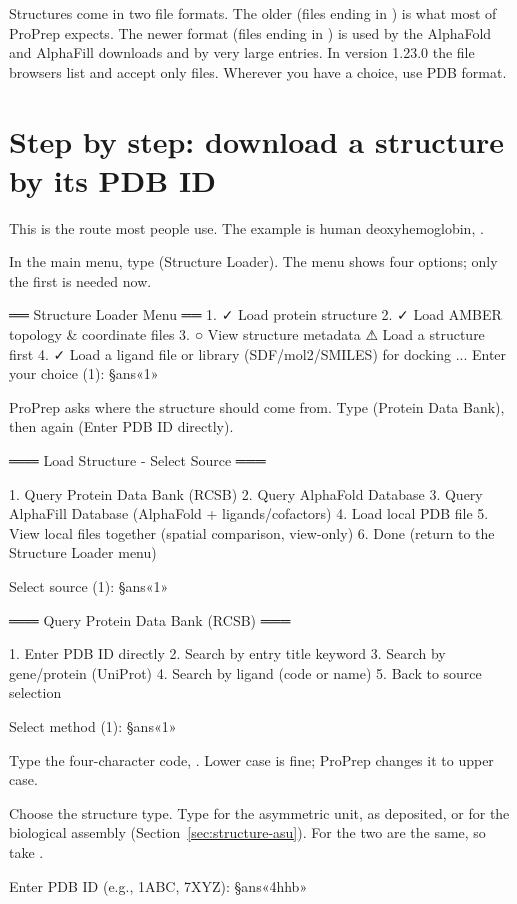 Structures come in two file formats. The older  (files ending
in ) is what most of ProPrep expects. The newer  format
(files ending in ) is used by the AlphaFold and AlphaFill downloads
and by very large entries. In version 1.23.0 the file browsers list and accept
only  files. Wherever you have a choice, use PDB format.

\section{Step by step: download a structure by its PDB ID}
\label{sec:structure-pdbid}

This is the route most people use. The example is human deoxyhemoglobin,
.

\begin{steps}
  \item In the main menu, type  (Structure Loader). The menu shows four
        options; only the first is needed now.
\begin{screen}
══ Structure Loader Menu ══
  1. ✓ Load protein structure
  2. ✓ Load AMBER topology & coordinate files
  3. ○ View structure metadata
       ⚠ Load a structure first
  4. ✓ Load a ligand file or library (SDF/mol2/SMILES) for docking
...
Enter your choice (1): §ans«1»
\end{screen}
  \item ProPrep asks where the structure should come from. Type 
        (Protein Data Bank), then  again (Enter PDB ID directly).
\begin{screen}
═══ Load Structure - Select Source ═══

1. Query Protein Data Bank (RCSB)
2. Query AlphaFold Database
3. Query AlphaFill Database (AlphaFold + ligands/cofactors)
4. Load local PDB file
5. View local files together (spatial comparison, view-only)
6. Done (return to the Structure Loader menu)

Select source (1): §ans«1»

═══ Query Protein Data Bank (RCSB) ═══

1. Enter PDB ID directly
2. Search by entry title keyword
3. Search by gene/protein (UniProt)
4. Search by ligand (code or name)
5. Back to source selection

Select method (1): §ans«1»
\end{screen}
  \item Type the four-character code, . Lower case is fine;
        ProPrep changes it to upper case.
  \item Choose the structure type. Type  for the asymmetric unit, as
        deposited, or  for the biological assembly
        (Section~\ref{sec:structure-asu}). For  the two are the same,
        so take .
\begin{screen}
Enter PDB ID (e.g., 1ABC, 7XYZ): §ans«4hhb»


\end{screen}
\end{steps}
